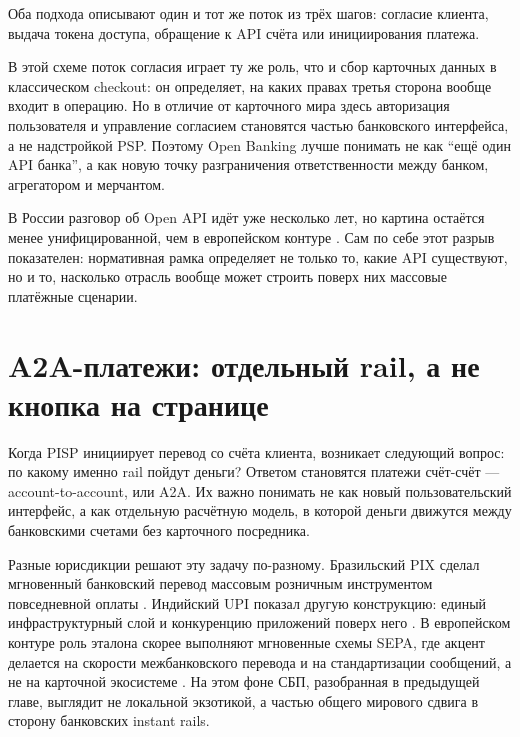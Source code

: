 Оба подхода описывают один и тот же поток из трёх шагов:
согласие клиента, выдача токена доступа, обращение к API счёта
или инициирования платежа.


В этой схеме поток согласия играет ту же роль, что и сбор карточных
данных в классическом checkout: он определяет, на каких правах
третья сторона вообще входит в операцию. Но в отличие от карточного
мира здесь авторизация пользователя и управление согласием становятся
частью банковского интерфейса, а не надстройкой PSP. Поэтому
Open Banking лучше понимать не как \enquote{ещё один API банка},
а как новую точку разграничения ответственности между банком,
агрегатором и мерчантом.

В России разговор об Open API идёт уже несколько лет, но картина
остаётся менее унифицированной, чем в европейском
контуре . Сам по себе этот
разрыв показателен: нормативная рамка определяет не только то,
какие API существуют, но и то, насколько отрасль вообще может
строить поверх них массовые платёжные сценарии.

\section{A2A-платежи: отдельный rail, а не кнопка на странице}
\label{sec:a2a-payments}

Когда PISP инициирует перевод со счёта клиента, возникает следующий
вопрос: по какому именно rail пойдут деньги? Ответом становятся
платежи счёт-счёт — account-to-account, или A2A. Их важно понимать
не как новый пользовательский интерфейс, а как отдельную расчётную
модель, в которой деньги движутся между банковскими счетами без
карточного посредника.

Разные юрисдикции решают эту задачу по-разному. Бразильский PIX
сделал мгновенный банковский перевод массовым розничным инструментом
повседневной оплаты . Индийский UPI показал другую
конструкцию: единый инфраструктурный слой и конкуренцию приложений
поверх него . В европейском контуре роль эталона
скорее выполняют мгновенные схемы SEPA, где акцент делается на скорости
межбанковского перевода и на стандартизации сообщений, а не на карточной
экосистеме . На этом фоне СБП, разобранная
в предыдущей главе, выглядит не локальной экзотикой, а частью
общего мирового сдвига в сторону банковских instant rails.

